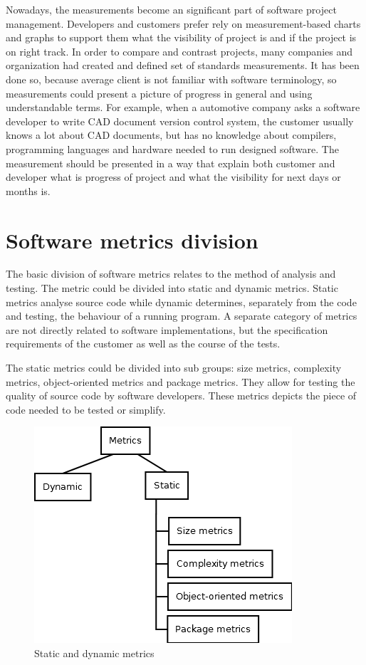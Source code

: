 Nowadays, the measurements become an significant part of software project management. Developers and customers prefer rely on measurement-based charts and graphs to support them what the visibility of project is and if the project is on right track. In order to compare and contrast projects, many companies and organization had created and defined set of standards measurements. It has been done so, because average client is not familiar with software terminology, so measurements could present a picture of progress in general and using understandable terms. For example, when a automotive company asks a software developer to write \ac{CAD} document version control system, the customer usually knows a lot about \ac{CAD} documents, but has no knowledge about compilers, programming languages and hardware needed to run designed software. The measurement should be presented in a way that explain both customer and developer what is progress of project and what the visibility for next days or months is.  

\section{Software metrics division}
The basic division of software metrics relates to the method of analysis and testing.  The metric could be divided into static and dynamic metrics. Static metrics analyse source code while dynamic determines, separately from the code and testing, the behaviour of a running program. A separate category of metrics are not directly related to software implementations, but the specification requirements of the customer as well as the course of the tests.

The static metrics could be divided into sub groups: size metrics, complexity metrics, object-oriented metrics and package metrics. They allow for testing the quality of source code by software developers. These metrics depicts the piece of code needed to be tested or simplify.  

\begin{figure}[h!]
	\centering
	\includegraphics[scale=0.7]{img/Diagram1.png} 
	\caption{Static and dynamic metrics}		
	\label{fig:metrics1}
\end{figure}

